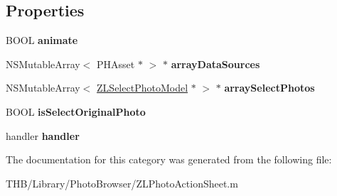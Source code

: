 \subsection*{Properties}
\begin{DoxyCompactItemize}
\item 
\mbox{\label{category_z_l_photo_action_sheet_07_08_a427485922cbdb39014d518f4faa41256}} 
B\+O\+OL {\bfseries animate}
\item 
\mbox{\label{category_z_l_photo_action_sheet_07_08_adf3364ebaedd307ed3b252c6d0ca93e4}} 
N\+S\+Mutable\+Array$<$ P\+H\+Asset $\ast$ $>$ $\ast$ {\bfseries array\+Data\+Sources}
\item 
\mbox{\label{category_z_l_photo_action_sheet_07_08_a3bd52c4c1d9e01325915c01dd4e3f9eb}} 
N\+S\+Mutable\+Array$<$ \mbox{\hyperlink{interface_z_l_select_photo_model}{Z\+L\+Select\+Photo\+Model}} $\ast$ $>$ $\ast$ {\bfseries array\+Select\+Photos}
\item 
\mbox{\label{category_z_l_photo_action_sheet_07_08_ae3d009f4151961f2e2f81f7ee11d887e}} 
B\+O\+OL {\bfseries is\+Select\+Original\+Photo}
\item 
\mbox{\label{category_z_l_photo_action_sheet_07_08_ad77551f319e3ceab5adb15d0635c5c02}} 
handler {\bfseries handler}
\end{DoxyCompactItemize}


The documentation for this category was generated from the following file\+:\begin{DoxyCompactItemize}
\item 
T\+H\+B/\+Library/\+Photo\+Browser/Z\+L\+Photo\+Action\+Sheet.\+m\end{DoxyCompactItemize}
